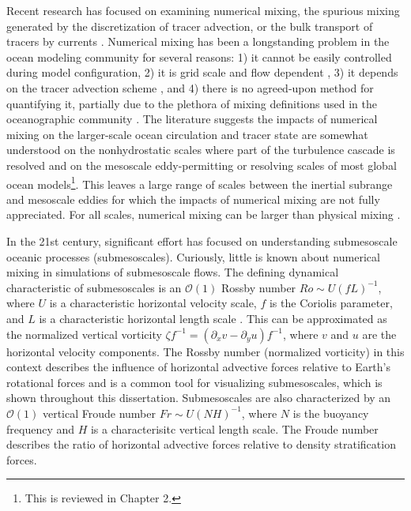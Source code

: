 Recent research has focused on examining numerical mixing, the spurious mixing generated by the discretization of tracer advection, or the bulk transport of tracers by currents \citep{Griffies_2000, Burchard_2008}. Numerical mixing has been a longstanding problem in the ocean modeling community for several reasons: 1) it cannot be easily controlled during model configuration, 2) it is grid scale and flow dependent \citep{Burchard_2008}, 3) it depends on the tracer advection scheme \citep{fofonova2021plume, Kalra_2019}, and 4) there is no agreed-upon method for quantifying it, partially due to the plethora of mixing definitions used in the oceanographic community \citep{Klingbeil_2014, MacCready_2018, winters1995available}. The literature suggests the impacts of numerical mixing on the larger-scale ocean circulation and tracer state are somewhat understood on the nonhydrostatic scales where part of the turbulence cascade is resolved \citep[e.g., large eddy simulations, ][]{domaradzki2003effective, thornber2007implicit} and on the mesoscale eddy-permitting or resolving scales of most global ocean models\footnote{This is reviewed in Chapter 2.}. This leaves a large range of scales between the inertial subrange and mesoscale eddies for which the impacts of numerical mixing are not fully appreciated. For all scales, numerical mixing can be larger than physical mixing \citep{domaradzki2003effective, Griffies_2000, Holmes_2021, Wang_2021}. 

In the 21st century, significant effort has focused on understanding submesoscale oceanic processes (submesoscales). Curiously, little is known about numerical mixing in simulations of submesoscale flows. The defining dynamical characteristic of submesoscales is an $\mathcal{O}(1)$ Rossby number $Ro \sim U(fL)^{-1}$, where $U$ is a characteristic horizontal velocity scale, $f$ is the Coriolis parameter, and $L$ is a characteristic horizontal length scale \citep{McWilliams_2016, mcwilliams2019survey,taylor2023submesoscale}. This can be approximated as the normalized vertical vorticity $\zeta f^{-1}= (\partial_x v - \partial_y u) f^{-1}$, where $v$ and $u$ are the horizontal velocity components. The Rossby number (normalized vorticity) in this context describes the influence of horizontal advective forces relative to Earth's rotational forces and is a common tool for visualizing submesoscales, which is shown throughout this dissertation. Submesoscales are also characterized by an $\mathcal{O}(1)$ vertical Froude number $Fr \sim U(NH)^{-1}$, where $N$ is the buoyancy frequency and $H$ is a characterisitc vertical length scale. The Froude number describes the ratio of horizontal advective forces relative to density stratification forces. 

